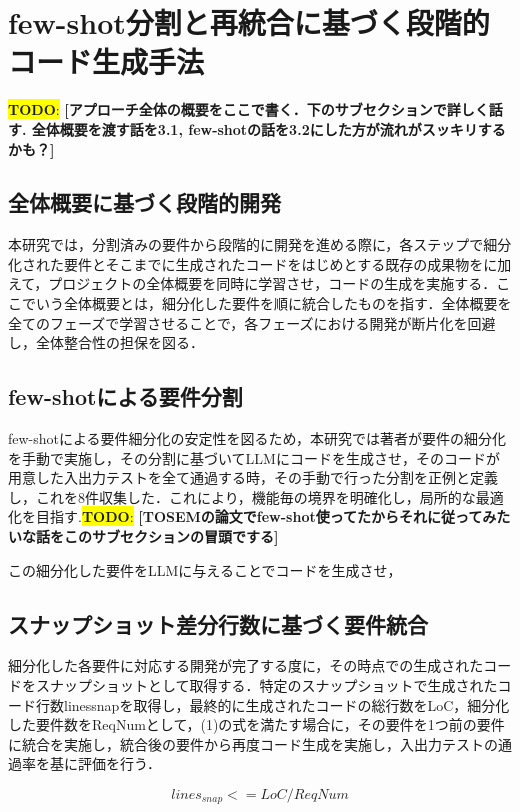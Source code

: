 \documentclass[submit,techrep,noauthor]{ipsj}
\newcommand{\todo}[1]{\colorbox{yellow}{{\bf TODO}:}{\color{red} {\textbf{[#1]}}}}
\begin{document}
\section{few-shot分割と再統合に基づく段階的コード生成手法}

\todo{アプローチ全体の概要をここで書く．下のサブセクションで詳しく話す. 全体概要を渡す話を3.1, few-shotの話を3.2にした方が流れがスッキリするかも？}

\subsection{全体概要に基づく段階的開発}
本研究では，分割済みの要件から段階的に開発を進める際に，各ステップで細分化された要件とそこまでに生成されたコードをはじめとする既存の成果物をに加えて，プロジェクトの全体概要を同時に学習させ，コードの生成を実施する．ここでいう全体概要とは，細分化した要件を順に統合したものを指す．全体概要を全てのフェーズで学習させることで，各フェーズにおける開発が断片化を回避し，全体整合性の担保を図る．

\subsection{few-shotによる要件分割}
few-shotによる要件細分化の安定性を図るため，本研究では著者が要件の細分化を手動で実施し，その分割に基づいてLLMにコードを生成させ，そのコードが用意した入出力テストを全て通過する時，その手動で行った分割を正例と定義し，これを8件収集した．これにより，機能毎の境界を明確化し，局所的な最適化を目指す.\todo{TOSEMの論文でfew-shot使ってたからそれに従ってみたいな話をこのサブセクションの冒頭でする}

この細分化した要件をLLMに与えることでコードを生成させ，

\subsection{スナップショット差分行数に基づく要件統合}
細分化した各要件に対応する開発が完了する度に，その時点での生成されたコードをスナップショットとして取得する．特定のスナップショットで生成されたコード行数linessnapを取得し，最終的に生成されたコードの総行数をLoC，細分化した要件数をReqNumとして，(1)の式を満たす場合に，その要件を1つ前の要件に統合を実施し，統合後の要件から再度コード生成を実施し，入出力テストの通過率を基に評価を行う．

\begin{equation}
    lines_{snap} <= LoC / ReqNum
\end{equation}
\end{document}
